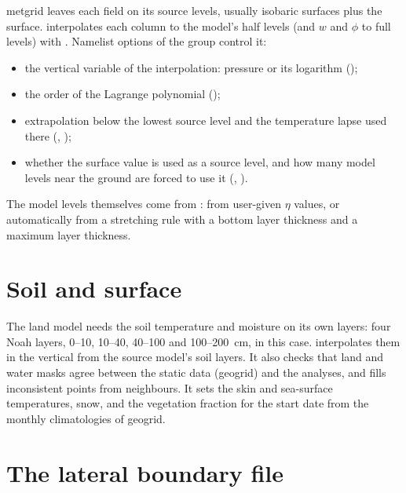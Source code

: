 metgrid leaves each field on its source levels, usually isobaric surfaces plus the surface. 
interpolates each column to the model's half levels (and $w$ and $\phi$ to full levels) with
. Namelist options of the  group control it:
\begin{itemize}
  \item the vertical variable of the interpolation: pressure or its logarithm ();
  \item the order of the Lagrange polynomial ();
  \item extrapolation below the lowest source level and the temperature lapse used there (,
    );
  \item whether the surface value is used as a source level, and how many model levels near the ground are forced
    to use it (, ).
\end{itemize}
The model levels themselves come from : from user-given $\eta$
values, or automatically from a stretching rule with a bottom layer thickness and a maximum layer thickness.

\section{Soil and surface}

The land model needs the soil temperature and moisture on its own layers: four Noah layers, 0--10, 10--40, 40--100
and 100--200~cm, in this case.  interpolates them in the vertical from the source model's soil layers.
It also checks that land and water masks agree between the static data (geogrid) and the analyses, and fills
inconsistent points from neighbours. It sets the skin and sea-surface temperatures, snow, and the vegetation
fraction for the start date from the monthly climatologies of geogrid.

\section{The lateral boundary file}

